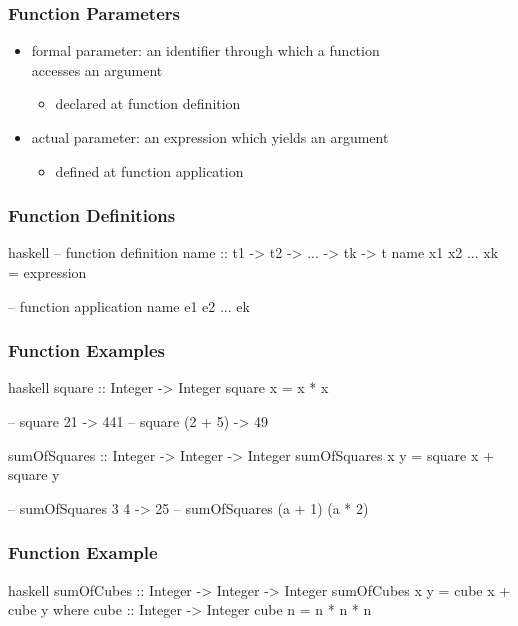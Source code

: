\documentclass[dvipsnames]{beamer}
\theoremstyle{plain}
\begin{document}
\begin{frame}
  \frametitle{Function Parameters}

  \begin{itemize}
    \item \alert{formal parameter}: an identifier through which a function\\
      accesses an argument
    \begin{itemize}
      \item declared at function definition
    \end{itemize}

    \pause
    \medskip
    \item \alert{actual parameter}: an expression which yields an argument
    \begin{itemize}
      \item defined at function application
    \end{itemize}
  \end{itemize}
\end{frame}

\begin{frame}[fragile]
  \frametitle{Function Definitions}

  \begin{block}{}
    \begin{pygments}{haskell}
-- function definition
name :: t1 -> t2 -> ... -> tk -> t
name x1 x2 ... xk = expression

-- function application
name e1 e2 ... ek
    \end{pygments}
  \end{block}
\end{frame}

\begin{frame}[fragile]
  \frametitle{Function Examples}

  \begin{exampleblock}{}
    \begin{pygments}{haskell}
square :: Integer -> Integer
square x = x * x

-- square 21 -> 441
-- square (2 + 5) -> 49

sumOfSquares :: Integer -> Integer -> Integer
sumOfSquares x y = square x + square y

-- sumOfSquares 3 4 -> 25
-- sumOfSquares (a + 1) (a * 2)
    \end{pygments}
  \end{exampleblock}
\end{frame}

\begin{frame}[fragile]
  \frametitle{Function Example}

  \begin{exampleblock}{}
    \begin{pygments}{haskell}
sumOfCubes :: Integer -> Integer -> Integer
sumOfCubes x y = cube x + cube y
  where
    cube :: Integer -> Integer
    cube n = n * n * n
    \end{pygments}
  \end{exampleblock}
\end{frame}
\end{document}
